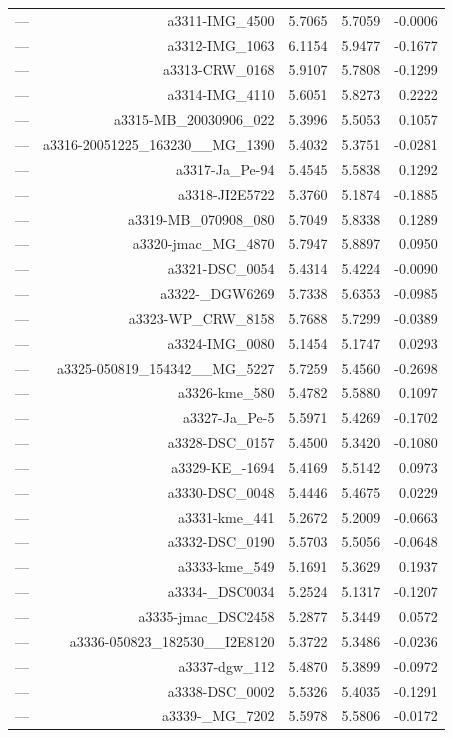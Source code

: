 \begin{table}[htbp]
\begin{tabular}{lrrrr}
— & a3311-IMG_4500 & 5.7065 & 5.7059 & -0.0006 \\
— & a3312-IMG_1063 & 6.1154 & 5.9477 & -0.1677 \\
— & a3313-CRW_0168 & 5.9107 & 5.7808 & -0.1299 \\
— & a3314-IMG_4110 & 5.6051 & 5.8273 & 0.2222 \\
— & a3315-MB_20030906_022 & 5.3996 & 5.5053 & 0.1057 \\
— & a3316-20051225_163230__MG_1390 & 5.4032 & 5.3751 & -0.0281 \\
— & a3317-Ja_Pe-94 & 5.4545 & 5.5838 & 0.1292 \\
— & a3318-JI2E5722 & 5.3760 & 5.1874 & -0.1885 \\
— & a3319-MB_070908_080 & 5.7049 & 5.8338 & 0.1289 \\
— & a3320-jmac_MG_4870 & 5.7947 & 5.8897 & 0.0950 \\
— & a3321-DSC_0054 & 5.4314 & 5.4224 & -0.0090 \\
— & a3322-_DGW6269 & 5.7338 & 5.6353 & -0.0985 \\
— & a3323-WP_CRW_8158 & 5.7688 & 5.7299 & -0.0389 \\
— & a3324-IMG_0080 & 5.1454 & 5.1747 & 0.0293 \\
— & a3325-050819_154342__MG_5227 & 5.7259 & 5.4560 & -0.2698 \\
— & a3326-kme_580 & 5.4782 & 5.5880 & 0.1097 \\
— & a3327-Ja_Pe-5 & 5.5971 & 5.4269 & -0.1702 \\
— & a3328-DSC_0157 & 5.4500 & 5.3420 & -0.1080 \\
— & a3329-KE_-1694 & 5.4169 & 5.5142 & 0.0973 \\
— & a3330-DSC_0048 & 5.4446 & 5.4675 & 0.0229 \\
— & a3331-kme_441 & 5.2672 & 5.2009 & -0.0663 \\
— & a3332-DSC_0190 & 5.5703 & 5.5056 & -0.0648 \\
— & a3333-kme_549 & 5.1691 & 5.3629 & 0.1937 \\
— & a3334-_DSC0034 & 5.2524 & 5.1317 & -0.1207 \\
— & a3335-jmac_DSC2458 & 5.2877 & 5.3449 & 0.0572 \\
— & a3336-050823_182530__I2E8120 & 5.3722 & 5.3486 & -0.0236 \\
— & a3337-dgw_112 & 5.4870 & 5.3899 & -0.0972 \\
— & a3338-DSC_0002 & 5.5326 & 5.4035 & -0.1291 \\
— & a3339-_MG_7202 & 5.5978 & 5.5806 & -0.0172 \\

\end{tabular}
\end{table}
